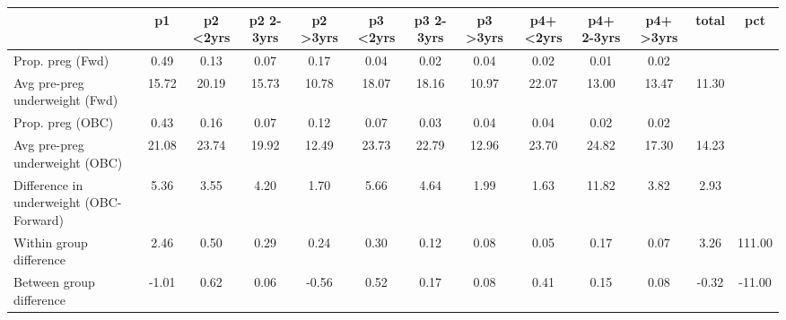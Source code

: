 \begin{tabular}{l*{12}{c}}
\toprule
            &\multicolumn{1}{c}{p1}&\multicolumn{1}{c}{p2 \textless2yrs}&\multicolumn{1}{c}{p2 2-3yrs}&\multicolumn{1}{c}{p2 \textgreater3yrs}&\multicolumn{1}{c}{p3 \textless2yrs}&\multicolumn{1}{c}{p3 2-3yrs}&\multicolumn{1}{c}{p3 \textgreater3yrs}&\multicolumn{1}{c}{p4+ \textless2yrs}&\multicolumn{1}{c}{p4+ 2-3yrs}&\multicolumn{1}{c}{p4+ \textgreater3yrs}&\multicolumn{1}{c}{total}&\multicolumn{1}{c}{pct}\\
\midrule
\midrule
Prop. preg (Fwd)&        0.49&        0.13&        0.07&        0.17&        0.04&        0.02&        0.04&        0.02&        0.01&        0.02&            &            \\
Avg pre-preg underweight (Fwd)&       15.72&       20.19&       15.73&       10.78&       18.07&       18.16&       10.97&       22.07&       13.00&       13.47&       11.30&            \\
Prop. preg (OBC)&        0.43&        0.16&        0.07&        0.12&        0.07&        0.03&        0.04&        0.04&        0.02&        0.02&            &            \\
Avg pre-preg underweight (OBC)&       21.08&       23.74&       19.92&       12.49&       23.73&       22.79&       12.96&       23.70&       24.82&       17.30&       14.23&            \\
Difference in underweight (OBC-Forward)&        5.36&        3.55&        4.20&        1.70&        5.66&        4.64&        1.99&        1.63&       11.82&        3.82&        2.93&            \\
Within group difference&        2.46&        0.50&        0.29&        0.24&        0.30&        0.12&        0.08&        0.05&        0.17&        0.07&        3.26&      111.00\\
Between group difference&       -1.01&        0.62&        0.06&       -0.56&        0.52&        0.17&        0.08&        0.41&        0.15&        0.08&       -0.32&      -11.00\\
\bottomrule
\end{tabular}
